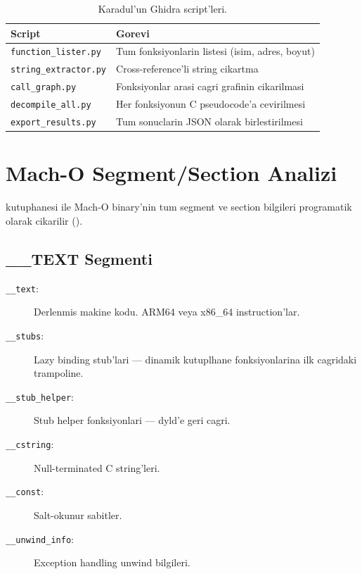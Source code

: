 \begin{table}[htbp]
\centering
\begin{tabular}{lp{8cm}}
\toprule
\textbf{\color{sectioncyan}Script} & \textbf{\color{sectioncyan}Gorevi} \\
\midrule
\texttt{function\_lister.py}  & Tum fonksiyonlarin listesi (isim, adres, boyut) \\
\texttt{string\_extractor.py} & Cross-reference'li string cikartma \\
\texttt{call\_graph.py}       & Fonksiyonlar arasi cagri grafinin cikarilmasi \\
\texttt{decompile\_all.py}    & Her fonksiyonun C pseudocode'a cevirilmesi \\
\texttt{export\_results.py}   & Tum sonuclarin JSON olarak birlestirilmesi \\
\bottomrule
\end{tabular}
\caption{Karadul'un Ghidra script'leri.}
\label{tab:ghidra-scripts}
\end{table}


\section{Mach-O Segment/Section Analizi}
\label{sec:macho-sections}

 kutuphanesi ile Mach-O binary'nin tum segment ve section bilgileri programatik olarak cikarilir ().

\subsection{\_\_TEXT Segmenti}

\begin{description}
\item[\texttt{\_\_text}:] Derlenm\-is makine kodu. ARM64 veya x86\_64 instruction'lar.
\item[\texttt{\_\_stubs}:] Lazy binding stub'lari --- dinamik kutuplhane fonksiyonlarina ilk cagridaki trampoline.
\item[\texttt{\_\_stub\_helper}:] Stub helper fonksiyonlari --- dyld'e geri cagri.
\item[\texttt{\_\_cstring}:] Null-terminated C string'leri.
\item[\texttt{\_\_const}:] Salt-okunur sabitler.
\item[\texttt{\_\_unwind\_info}:] Exception handling unwind bilgileri.
\end{description}

